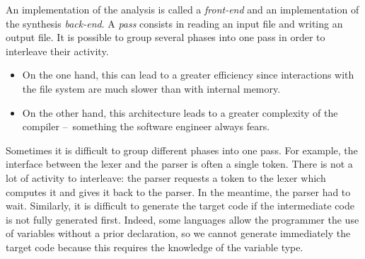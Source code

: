 An implementation of the analysis is called a \emph{front-end} and an
implementation of the synthesis \emph{back-end}. A \emph{pass}
consists in reading an input file and writing an output file. It is
possible to group several phases into one pass in order to interleave
their activity.
\begin{itemize}

  \item On the one hand, this can lead to a greater efficiency since
    interactions with the file system are much slower than with
    internal memory.

  \item On the other hand, this architecture leads to a greater
    complexity of the compiler --~something the software engineer
    always fears.

\end{itemize}
Sometimes it is difficult to group different phases into one pass. For
example, the interface between the lexer and the parser is often a
single token. There is not a lot of activity to interleave: the parser
requests a token to the lexer which computes it and gives it back to
the parser. In the meantime, the parser had to wait. Similarly, it is
difficult to generate the target code if the intermediate code is not
fully generated first. Indeed, some languages allow the programmer the
use of variables without a prior declaration, so we cannot generate
immediately the target code because this requires the knowledge of the
variable type.
